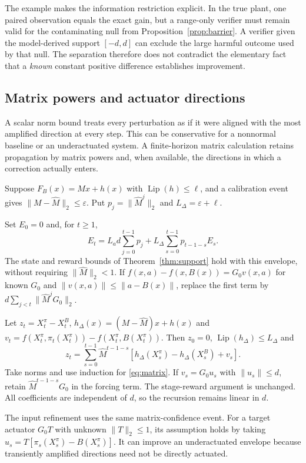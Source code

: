\documentclass[twocolumn,nameyear]{autart}
\begin{document}
The example makes the information restriction explicit. In the true
plant, one paired observation equals the exact gain, but a range-only
verifier must remain valid for the contaminating null from
Proposition~\ref{prop:barrier}. A verifier given the model-derived
support $[-d,d]$ can exclude the large harmful outcome used by that
null. The separation therefore does not contradict the elementary fact
that a \emph{known} constant positive difference establishes improvement.

\subsection{Matrix powers and actuator directions}
A scalar norm bound treats every perturbation as if it were aligned
with the most amplified direction at every step. This can be conservative
for a nonnormal baseline or an underactuated system. A finite-horizon
matrix calculation retains propagation by matrix powers and, when
available, the directions in which a correction actually enters.

Suppose $F_B(x)=Mx+h(x)$ with $\operatorname{Lip}(h)\le\ell$, and a calibration
event gives $\|M-\widehat M\|_2\le\varepsilon$. Put
$p_j=\|\widehat M^j\|_2$ and $L_\Delta=\varepsilon+\ell$.

\begin{prop}\label{prop:matrix}
Set $E_0=0$ and, for $t\ge1$,
\begin{equation}\label{eq:matrix}
 E_t=L_ad\sum_{j=0}^{t-1}p_j+
       L_\Delta\sum_{s=0}^{t-1}p_{t-1-s}E_s.
\end{equation}
The state and reward bounds of Theorem~\ref{thm:support} hold with this
envelope, without requiring $\|\widehat M\|_2<1$.
If $f(x,a)-f(x,B(x))=G_0v(x,a)$ for known $G_0$ and
$\|v(x,a)\|\le\|a-B(x)\|$, replace the first term by
$d\sum_{j<t}\|\widehat M^jG_0\|_2$.
\end{prop}
\begin{pf}
Let $z_t=X_t^\pi-X_t^B$,
$h_\Delta(x)=(M-\widehat M)x+h(x)$ and
$v_t=f(X_t^\pi,\pi_t(X_t^\pi))-f(X_t^\pi,B(X_t^\pi))$.
Then $z_0=0$, $\operatorname{Lip}(h_\Delta)\le L_\Delta$ and
\[
 z_t=\sum_{s=0}^{t-1}\widehat M^{t-1-s}
       [h_\Delta(X_s^\pi)-h_\Delta(X_s^B)+v_s].
\]
Take norms and use induction for \eqref{eq:matrix}. If $v_s=G_0u_s$
with $\|u_s\|\le d$, retain $\widehat M^{t-1-s}G_0$ in the forcing
term. The stage-reward argument is unchanged. All coefficients are
independent of $d$, so the recursion remains linear in $d$.
\end{pf}
The input refinement uses the same matrix-confidence event. For a target
actuator $G_0T$ with unknown $\|T\|_2\le1$, its assumption holds by
taking $u_s=T[\pi_s(X_s^\pi)-B(X_s^\pi)]$. It can improve an
underactuated envelope because transiently amplified directions need not
be directly actuated.
\end{document}
